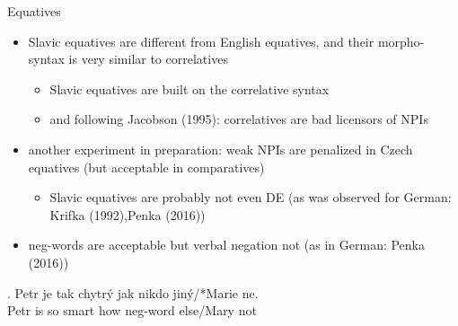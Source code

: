 \documentclass[
  ignorenonframetext,
]{beamer}
\providecommand{\tightlist}{%
  \setlength{\itemsep}{0pt}\setlength{\parskip}{0pt}}\usepackage{longtable,booktabs,array}
\begin{document}
\begin{frame}
\begin{block}{Equatives}
\protect\hypertarget{equatives}{}
\begin{itemize}
\tightlist
\item
  Slavic equatives are different from English equatives, and their
  morpho-syntax is very similar to correlatives

  \begin{itemize}
  \tightlist
  \item
    Slavic equatives are built on the correlative syntax
  \item
    and following Jacobson (1995): correlatives are bad licensors of
    NPIs
  \end{itemize}
\item
  another experiment in preparation: weak NPIs are penalized in Czech
  equatives (but acceptable in comparatives)

  \begin{itemize}
  \tightlist
  \item
    Slavic equatives are probably not even DE (as was observed for
    German: Krifka (1992),Penka (2016))
  \end{itemize}
\item
  neg-words are acceptable but verbal negation not (as in German: Penka
  (2016))
\end{itemize}

\exg. Petr je tak chytrý jak nikdo jiný/*Marie ne.\\
Petr is so smart how neg-word else/Mary not\\
\hspace*{0.333em}

~
\end{block}
\end{frame}
\end{document}
